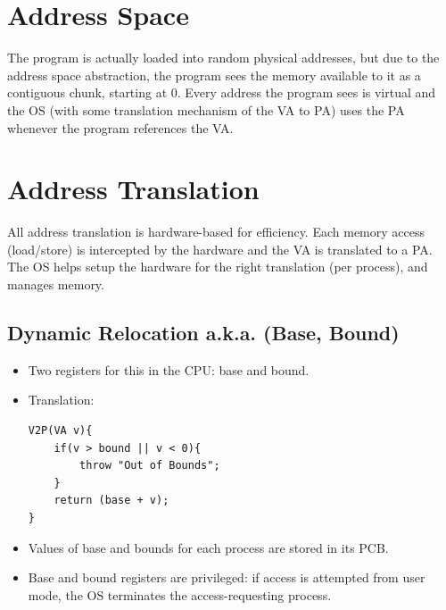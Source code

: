 \documentclass[10pt]{report}
\begin{document}
\section{Address Space}
The program is actually loaded into random physical addresses, but due to the address space
abstraction, the program sees the memory available to it as a contiguous chunk, starting at 0.
Every address the program sees is virtual and the OS (with some translation mechanism
of the VA to PA) uses the PA whenever the program references the VA.
\section{Address Translation}
All address translation is hardware-based for efficiency.
Each memory access (load/store) is intercepted by the hardware
and the VA is translated to a PA. The OS helps setup the
hardware for the right translation (per process), and manages memory.
\subsection{Dynamic Relocation a.k.a. (Base, Bound)}
\begin{itemize}
\item Two registers for this in the CPU: base and bound.
\item Translation:
\begin{lstlisting}
V2P(VA v){
    if(v > bound || v < 0){
        throw "Out of Bounds";
    }
    return (base + v);
}
\end{lstlisting}
\item Values of base and bounds for each process are stored in its
PCB.
\item Base and bound registers are privileged: if access is attempted
from user mode, the OS terminates the access-requesting process.
\end{itemize}
\end{document}
